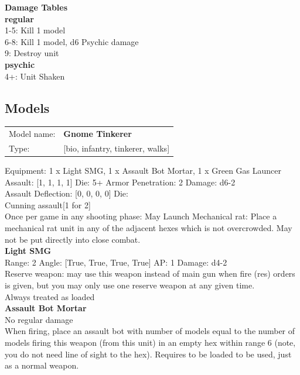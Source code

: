 {\bf Damage Tables} \\
 {\bf regular } \\
1-5: Kill 1 model \\
6-8: Kill 1 model, d6 Psychic damage \\
9: Destroy unit \\
 {\bf psychic } \\
4+: Unit Shaken \\


\clearpage

\subsection{ Models }

\begin{tabular}{ll}
Model name: & {\bf Gnome Tinkerer } \\
Type: & [bio, infantry, tinkerer, walks] \\
\end{tabular}

Equipment: 1 x Light SMG, 1 x Assault Bot Mortar, 1 x Green Gas Launcer \\

Assault: [1, 1, 1, 1] Die: 5+ Armor Penetration: 2 Damage: d6-2 \\
Assault Deflection: [0, 0, 0, 0] Die: \\
\indent Cunning assault[1 for 2]\\ 
 

Once per game in any shooting phase: May Launch Mechanical rat: Place a mechanical rat unit in any of the adjacent hexes which is not overcrowded. May not be put directly into close combat. \\ 


{\bf Light SMG } \\



Range: 2  Angle: [True, True, True, True] AP: 1 Damage: d4-2 \\
Reserve weapon: may use this weapon instead of main gun when fire (res) orders is given, but you may only use one reserve weapon at any given time.\\ 
Always treated as loaded\\ 




{\bf Assault Bot Mortar } \\

No regular damage\\ 
When firing, place an assault bot with number of models equal to the number of models firing this weapon (from this unit) in an empty hex within range 6 (note, you do not need line of sight to the hex). Requires to be loaded to be used, just as a normal weapon.\\ 





